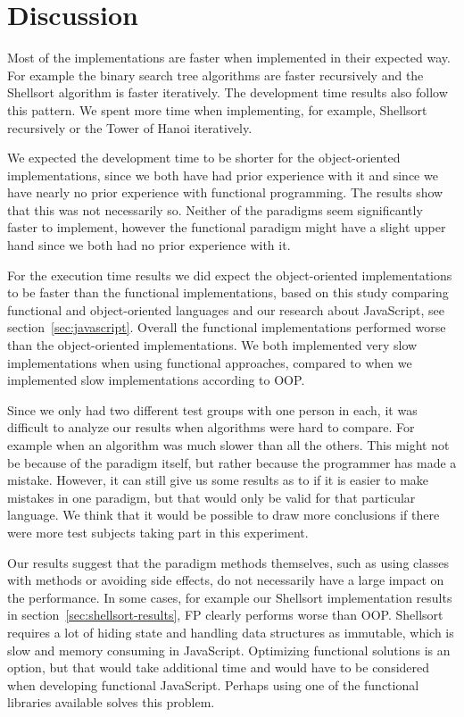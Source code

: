 \documentclass {article}
\begin{document}
\section{Discussion}
Most of the implementations are faster when implemented in their expected way. For example the binary search tree algorithms are faster recursively and the Shellsort algorithm is faster iteratively. The development time results also follow this pattern. We spent more time when implementing, for example, Shellsort recursively or the Tower of Hanoi iteratively. 

We expected the development time to be shorter for the object-oriented implementations, since we both have had prior experience with it and since we have nearly no prior experience with functional programming. The results show that this was not necessarily so. Neither of the paradigms seem significantly faster to implement, however the functional paradigm might have a slight upper hand since we both had no prior experience with it. 

For the execution time results we did expect the object-oriented implementations to be faster than the functional implementations, based on this study comparing functional and object-oriented languages \cite{hasmadole} and our research about JavaScript, see section~\ref{sec:javascript}. Overall the functional implementations performed worse than the object-oriented implementations. We both implemented very slow implementations when using functional approaches, compared to when we implemented slow implementations according to OOP.

Since we only had two different test groups with one person in each, it was difficult to analyze our results when algorithms were hard to compare. For example when an algorithm was much slower than all the others. This might not be because of the paradigm itself, but rather because the programmer has made a mistake. However, it can still give us some results as to if it is easier to make mistakes in one paradigm, but that would only be valid for that particular language. We think that it would be possible to draw more conclusions if there were more test subjects taking part in this experiment.

Our results suggest that the paradigm methods themselves, such as using classes with methods or avoiding side effects, do not necessarily have a large impact on the performance. In some cases, for example our Shellsort implementation results in section~\ref{sec:shellsort-results}, FP clearly performs worse than OOP. Shellsort requires a lot of hiding state and handling data structures as immutable, which is slow and memory consuming in JavaScript. Optimizing functional solutions is an option, but that would take additional time and would have to be considered when developing functional JavaScript. Perhaps using one of the functional libraries available solves this problem.
\end{document}
